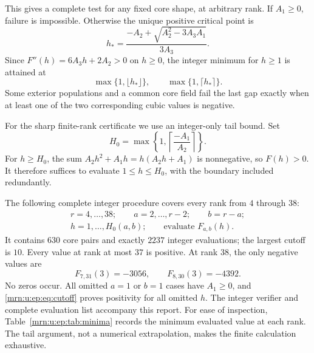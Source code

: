\documentclass[11pt,a4paper]{article}
\theoremstyle{remark}\newtheorem{remark}[theorem]{Remark}
\begin{document}
This gives a complete test for any fixed core shape, at arbitrary rank. If $A_1\ge0$, failure is impossible. Otherwise the unique positive critical point is
\[
 h_* =\frac{-A_2+\sqrt{A_2^2-3A_3A_1}}{3A_3}.
\]
Since $F''(h)=6A_3h+2A_2>0$ on $h\ge0$, the integer minimum for $h\ge1$ is attained at
\[
 \max\{1,\lfloor h_*\rfloor\},\qquad
 \max\{1,\lceil h_*\rceil\}.
\]
Some exterior populations and a common core field fail the last gap exactly when at least one of the two corresponding cubic values is negative.

For the sharp finite-rank certificate we use an integer-only tail bound. Set
\begin{equation}\label{mrn:u:ep:eq:cutoff}
 H_0=\max\left\{1,\left\lceil\frac{-A_1}{A_2}\right\rceil\right\}.
\end{equation}
For $h\ge H_0$, the sum $A_2h^2+A_1h=h(A_2h+A_1)$ is nonnegative, so $F(h)>0$. It therefore suffices to evaluate $1\le h\le H_0$, with the boundary included redundantly.

The following complete integer procedure covers every rank from $4$ through $38$:
\[
 \begin{gathered}
 r=4,\ldots,38;\qquad a=2,\ldots,r-2;\qquad b=r-a;\\
 h=1,\ldots,H_0(a,b);\qquad\text{evaluate }F_{a,b}(h).
 \end{gathered}
\]
It contains $630$ core pairs and exactly $2237$ integer evaluations; the largest cutoff is $10$. Every value at rank at most $37$ is positive. At rank $38$, the only negative values are
\begin{equation}\label{mrn:u:ep:eq:two}
 F_{7,31}(3)=-3056,\qquad F_{8,30}(3)=-4392.
\end{equation}
No zeros occur. All omitted $a=1$ or $b=1$ cases have $A_1\ge0$, and \eqref{mrn:u:ep:eq:cutoff} proves positivity for all omitted $h$. The integer verifier and complete evaluation list accompany this report. For ease of inspection, Table~\ref{mrn:u:ep:tab:minima} records the minimum evaluated value at each rank. The tail argument, not a numerical extrapolation, makes the finite calculation exhaustive.
\end{document}
